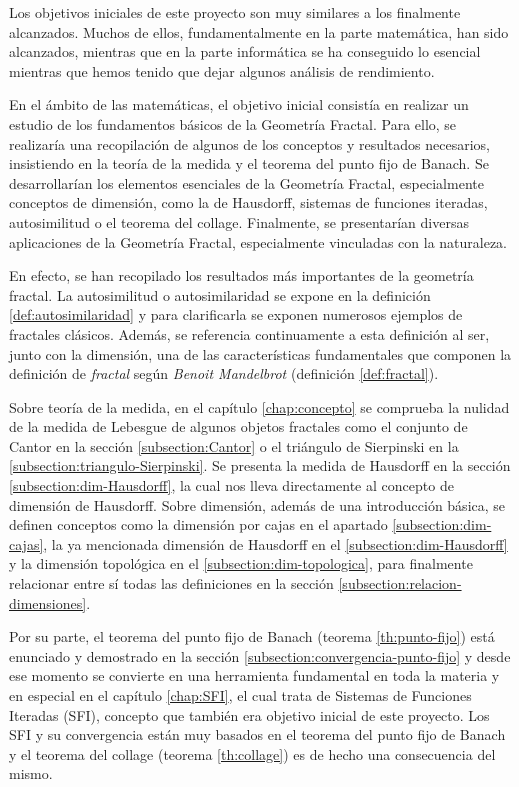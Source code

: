 Los objetivos iniciales de este proyecto son muy similares a los finalmente alcanzados. Muchos de ellos, fundamentalmente en la parte matemática, han sido alcanzados, mientras que en la parte informática se ha conseguido lo esencial mientras que hemos tenido que dejar algunos análisis de rendimiento. 

En el ámbito de las matemáticas, el objetivo inicial consistía en realizar un estudio de los fundamentos básicos de la Geometría Fractal. Para ello, se realizaría una recopilación de algunos de los conceptos y resultados necesarios, insistiendo en la teoría de la medida y el teorema del punto fijo de Banach. Se desarrollarían los elementos esenciales de la Geometría Fractal, especialmente conceptos de dimensión, como la de Hausdorff, sistemas de funciones iteradas, autosimilitud o el teorema del collage. Finalmente, se presentarían diversas aplicaciones de la Geometría Fractal, especialmente vinculadas con la naturaleza.

En efecto, se han recopilado los resultados más importantes de la geometría fractal. La autosimilitud o autosimilaridad se expone en la definición \ref{def:autosimilaridad} y para clarificarla se exponen numerosos ejemplos de fractales clásicos. Además, se referencia continuamente a esta definición al ser, junto con la dimensión, una de las características fundamentales que componen la definición de \textit{fractal} según \textit{Benoit Mandelbrot} (definición \ref{def:fractal}).

Sobre teoría de la medida, en el capítulo \ref{chap:concepto} se comprueba la nulidad de la medida de Lebesgue de algunos objetos fractales como el conjunto de Cantor en la sección \ref{subsection:Cantor} o el triángulo de Sierpinski en la \ref{subsection:triangulo-Sierpinski}. Se presenta la medida de Hausdorff en la sección \ref{subsection:dim-Hausdorff}, la cual nos lleva directamente al concepto de dimensión de Hausdorff. Sobre dimensión, además de una introducción básica, se definen conceptos como la dimensión por cajas en el apartado \ref{subsection:dim-cajas}, la ya mencionada dimensión de Hausdorff en el \ref{subsection:dim-Hausdorff} y la dimensión topológica en el \ref{subsection:dim-topologica}, para finalmente relacionar entre sí todas las definiciones en la sección \ref{subsection:relacion-dimensiones}. 

Por su parte, el teorema del punto fijo de Banach (teorema \ref{th:punto-fijo}) está enunciado y demostrado en la sección \ref{subsection:convergencia-punto-fijo} y desde ese momento se convierte en una herramienta fundamental en toda la materia y en especial en el capítulo \ref{chap:SFI}, el cual trata de Sistemas de Funciones Iteradas (SFI), concepto que también era objetivo inicial de este proyecto. Los SFI y su convergencia están muy basados en el teorema del punto fijo de Banach y el teorema del collage (teorema \ref{th:collage}) es de hecho una consecuencia del mismo.

